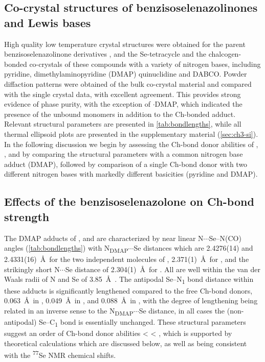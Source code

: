 \begin{refsection}
\subsection{Co-crystal structures of benzisoselenazolinones and Lewis bases}
High quality low temperature crystal structures were obtained for the parent benzisoselenazolinone derivatives  \autocite{Thomas2015},  and the Se-tetracycle  and the chalcogen-bonded co-crystals of these compounds with a variety of nitrogen bases, including pyridine, dimethylaminopyridine (DMAP) quinuclidine and DABCO.
Powder diffaction patterns were obtained of the bulk co-crystal material and compared with the single crystal data, with excellent agreement.
This provides strong evidence of phase purity, with the exception of $\cdot$DMAP, which indicated the presence of the unbound monomers in addition to the Ch-bonded adduct.
Relevant structural parameters are presented in \cref{tab:bondlengths}, while all thermal ellipsoid plots are presented in the supplementary material (\cref{sec:ch3-si}).
In the following discussion we begin by assessing the Ch-bond donor abilities of , , and  by comparing the structural parameters with a common nitrogen base adduct (DMAP), followed by comparison of a single Ch-bond donor  with two different nitrogen bases with markedly different basicities (pyridine and DMAP).

\subsection{Effects of the benzisoselenazolone on Ch-bond strength}
The DMAP adducts of ,  and  are characterized by near linear N$\cdots$Se--N(CO) angles (\cref{tab:bondlengths}) with N\textsubscript{DMAP}$\cdots$Se distances which are 2.4276(14) and 2.4331(16)~\AA \ for the two independent molecules of , 2.371(1)~\AA\ for , and the strikingly short N$\cdots$Se distance of 2.304(1)~\AA\ for .
All are well within the van der Waals radii of N and Se of 3.85~\AA\ \autocite{Batsanov2001}.
The antipodal Se--N\textsubscript{1} bond distance within these adducts is significantly lengthened compared to the free Ch-bond donors, 0.063~\AA\ in , 0.049~\AA\ in , and 0.088~\AA\ in , with the degree of lengthening being related in an inverse sense to the N\textsubscript{DMAP}$\cdots$Se distance, in all cases the (non-antipodal) Se--C\textsubscript{1} bond is essentially unchanged.
These structural parameters suggest an order of Ch-bond donor abilities  <  < , which is supported by theoretical calculations which are discussed below, as well as being consistent with the \textsuperscript{77}Se NMR chemical shifts.


\end{refsection}
